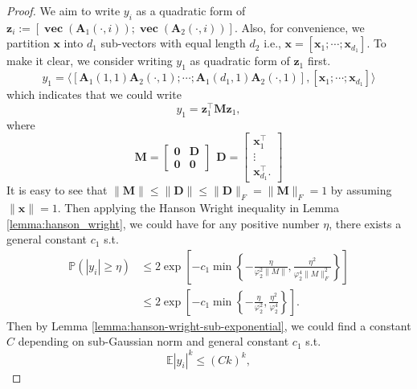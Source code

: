 \begin{proof}
	
	We aim to write $y_i$ as a quadratic form of $\mathbf{z}_i:=[\mathop{\mathbf{vec}}(\mathbf{A}_{1}(\cdot,i)); \mathop{\mathbf{vec}}(\mathbf{A}_{2}(\cdot,i))]$. Also, for convenience, we partition $\mathbf{x}$ into $d_1$ sub-vectors with equal length $d_2$ i.e., $\mathbf{x} = [\mathbf{x}_1; \cdots; \mathbf{x}_{d_1}]$. To make it clear, we consider writing $y_1$ as quadratic form of $\mathbf{z}_1$ first.  
	\begin{equation}
	y_1 = \langle [\mathbf{A}_{1}(1,1) \mathbf{A}_{2}(\cdot,1); \cdots; \mathbf{A}_{1}(d_1,1) \mathbf{A}_{2}(\cdot,1)], [\mathbf{x}_1;\cdots; \mathbf{x}_{d_1}]\rangle
	\nonumber 
	\end{equation}
	which indicates that we could write
	\begin{equation}
	y_1 = \mathbf{z}^\top_1
	\mathbf{M}\mathbf{z}_1, \nonumber
	\end{equation}
	where 
	\begin{equation}
	\mathbf{M} = \begin{bmatrix}
	\mathbf{0} & \mathbf{D}\\
	\mathbf{0} & \mathbf{0}
	\end{bmatrix}  ~~
	\mathbf{D} = \begin{bmatrix}
	\mathbf{x}_1^\top \\
	\vdots \\
	\mathbf{x}_{d_1}^\top.  \nonumber
	\end{bmatrix}
	\end{equation}
	It is easy to see that $\|\mathbf{M}\| \le \|\mathbf{D}\| \le \|\mathbf{D}\|_F = \|\mathbf{M}\|_F = 1$ by assuming $\|\mathbf{x}\| = 1$. Then applying the Hanson Wright inequality in Lemma \ref{lemma:hanson_wright}, we could have for any positive number $\eta$, there exists a general constant $c_1$ s.t. 
	\begin{equation}
	\begin{aligned}
	\mathbb{P}(|y_i|\ge \eta) & \le 2\exp\left[-c_1\min\left\{ -\frac{\eta}{\varphi_2^2 \|M\|} ,  \frac{\eta^2}{\varphi_2^4 \|M\|^2_F} \right\} \right] \\
	& \le  2\exp\left[-c_1\min\left\{ -\frac{\eta}{\varphi_2^2} ,  \frac{\eta^2}{\varphi_2^4 } \right\} \right].  \nonumber
	\end{aligned}
	\end{equation}
	Then by Lemma \ref{lemma:hanson-wright-sub-exponential}, we could find a constant $C$ depending on sub-Gaussian norm and general constant $c_1$ s.t.
	\begin{equation}
	\mathbb{E} |y_i|^k \le (Ck)^k, \nonumber 

\end{equation}
\end{proof}
